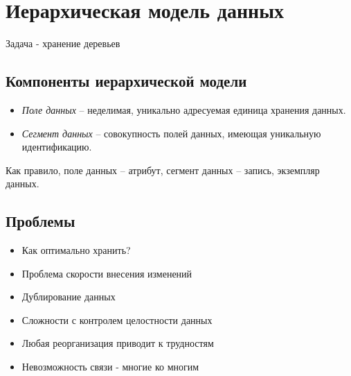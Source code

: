 
\usepackage[utf8]{inputenc}
\usepackage[russian]{babel}
\parindent 0pt
\parskip 8pt
\usepackage{amsmath}
\usepackage{amssymb}
\usepackage{array}
\usepackage{floatrow}
\usepackage{float}
\usepackage[left=2.3cm, right=2.3cm, top=2.7cm, bottom=2.7cm, bindingoffset=0cm]{geometry}
\usepackage{hyperref}
\usepackage{graphicx}
\usepackage{multicol}
\usepackage{fancyhdr} 
\usepackage{extramarks}
\usepackage[usenames,dvipsnames]{color}
\usepackage{titlesec}
\usepackage{tikz}
\usepackage[T2A]{fontenc} 

\pagestyle{fancy}
\fancyhf{}
\rhead{\thepage}
\cfoot{}
\renewcommand\headrulewidth{0.4pt}
\renewcommand\footrulewidth{0.4pt}



\section{Иерархическая модель данных}

Задача - хранение деревьев

\subsection{Компоненты иерархической модели}

\begin{itemize}
    \item \emph{Поле данных} -- неделимая, уникально адресуемая единица хранения данных.
    \item \emph{Сегмент данных} -- совокупность полей данных, имеющая уникальную идентификацию.
\end{itemize}

Как правило, поле данных -- атрибут, сегмент данных -- запись, экземпляр данных.

\subsection{Проблемы}

\begin{itemize}
    \item Как оптимально хранить?
    \item Проблема скорости внесения изменений
    \item Дублирование данных
    \item Сложности с контролем целостности данных
    \item Любая реорганизация приводит к трудностям
    \item Невозможность связи - многие ко многим
\end{itemize}

